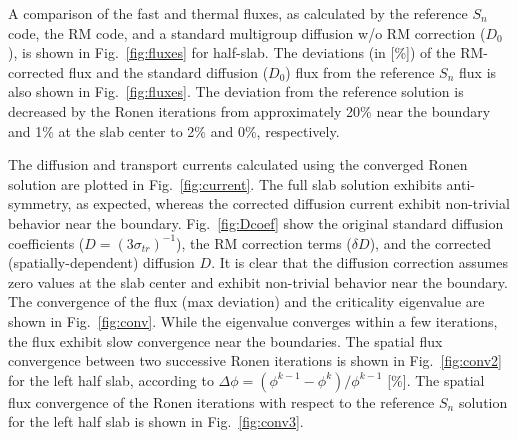 
A comparison of the fast and thermal fluxes, as calculated by the reference $S_n$ code, the RM code, and a standard multigroup diffusion w/o RM correction ($D_0$), is shown in Fig.~\ref{fig:fluxes} for half-slab. The deviations (in [\%]) of the RM-corrected flux and the standard diffusion ($D_0$) flux from the reference $S_n$ flux is also shown in Fig.~\ref{fig:fluxes}. The deviation from the reference solution is decreased by the Ronen iterations from approximately 20\% near the boundary and 1\% at the slab center to 2\% and 0\%, respectively. 

The diffusion and transport currents calculated using the converged Ronen solution are plotted in Fig.~\ref{fig:current}. The full slab solution exhibits anti-symmetry, as expected, whereas the corrected diffusion current exhibit non-trivial behavior near the boundary. Fig.~\ref{fig:Dcoef} show the original standard diffusion coefficients ($D=(3\sigma_{tr})^{-1}$), the RM correction terms ($\delta D$), and the corrected (spatially-dependent) diffusion $D$. It is clear that the diffusion correction assumes zero values at the slab center and exhibit non-trivial behavior near the boundary. The convergence of the flux (max deviation) and the criticality eigenvalue are shown in Fig.~\ref{fig:conv}. While the eigenvalue converges within a few iterations, the flux exhibit slow convergence near the boundaries. The spatial flux convergence between two successive Ronen iterations is shown in Fig.~\ref{fig:conv2} for the left half slab, according to $\Delta\phi = (\phi^{k-1}-\phi^k)/\phi^{k-1}$ [\%]. The spatial flux convergence of the Ronen iterations with respect to the reference $S_n$ solution for the left half slab is shown in Fig.~\ref{fig:conv3}.

